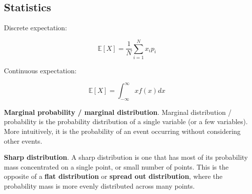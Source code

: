 \subsection{Statistics}
\label{appendix:statistics}

Discrete expectation:

\[ \mathbb{E}[X] = \frac{1}{N} \sum_{i=1}^{N} x_i p_i \]

Continuous expectation:

\[ \mathbb{E}[X] = \int_{-\infty}^{\infty} x f(x) dx \]






\textbf{Marginal probability / marginal distribution}. Marginal distribution / probability is the probability distribution of a single variable (or a few variables). More intuitively, it is the probability of an event occurring without considering other events.



\textbf{Sharp distribution}. A sharp distribution is one that has most of its probability mass concentrated on a single point, or small number of points. This is the opposite of a \textbf{flat distribution} or \textbf{spread out distribution}, where the probability mass is more evenly distributed across many points.